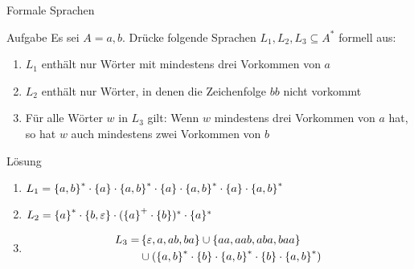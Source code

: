 
\begin{frame}{Formale Sprachen}
	\begin{exampleblock}{Aufgabe}
		Es sei $A = {a,b}$. Drücke folgende Sprachen $L_1, L_2, L_3 \subseteq A^*$ formell aus:
		\begin{enumerate}
			\item $L_1$ enthält nur Wörter mit mindestens drei Vorkommen von $a$
			\item $L_2$ enthält nur Wörter, in denen die Zeichenfolge $bb$ nicht vorkommt
			\item Für alle Wörter $w$ in $L_3$ gilt: Wenn $w$ mindestens drei Vorkommen von $a$ hat, so hat $w$ auch mindestens zwei Vorkommen von $b$ 
		\end{enumerate}
	\end{exampleblock}
	\pause
	\begin{block}{Lösung}
		\begin{enumerate}
			\item $L_1 = \left\{ a,b \right\}^\ast \cdot \left\{ a \right\} \cdot \left\{ a,b \right\}^\ast \cdot \left\{ a \right\} \cdot \left\{ a,b \right\}^\ast \cdot \left\{ a \right\} \cdot \left\{ a,b \right\}^\ast$
			\item $L_2 = \left\{ a \right\}^\ast \cdot \left\{ b, \varepsilon \right\} \cdot (\left\{ a \right\}^+ \cdot \left\{ b \right\})^\ast \cdot \{ a \}^*$ 
			\item \begin{align*}L_3 = & \left\{ \varepsilon, a, ab, ba \right\} \cup \left\{ aa, aab, aba, baa \right\} \\ & \cup (\left\{ a,b \right\}^\ast \cdot \left\{ b \right\} \cdot \left\{ a,b \right\}^\ast \cdot \left\{ b \right\} \cdot \left\{ a,b \right\}^\ast) \end{align*}
		\end{enumerate}
	\end{block}
\end{frame}